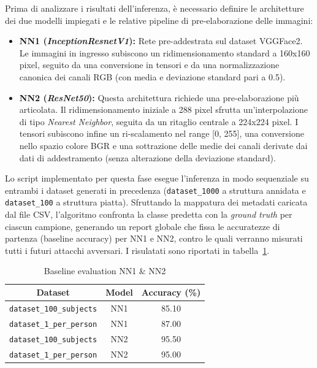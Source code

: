 \documentclass[a4paper, 12pt]{article}
\begin{document}
Prima di analizzare i risultati dell'inferenza, è necessario definire le architetture dei due modelli impiegati e le relative pipeline di pre-elaborazione delle immagini:

\begin{itemize}
    \item \textbf{NN1 (\textit{InceptionResnetV1}):} Rete pre-addestrata sul dataset VGGFace2. Le immagini in ingresso subiscono un ridimensionamento standard a 160x160 pixel, seguito da una conversione in tensori e da una normalizzazione canonica dei canali RGB (con media e deviazione standard pari a 0.5).
    
    \item \textbf{NN2 (\textit{ResNet50}):} Questa architettura richiede una pre-elaborazione più articolata. Il ridimensionamento iniziale a 288 pixel sfrutta un'interpolazione di tipo \textit{Nearest Neighbor}, seguita da un ritaglio centrale a 224x224 pixel. I tensori subiscono infine un ri-scalamento nel range [0, 255], una conversione nello spazio colore BGR e una sottrazione delle medie dei canali derivate dai dati di addestramento (senza alterazione della deviazione standard).
\end{itemize}

Lo script implementato per questa fase esegue l'inferenza in modo sequenziale su entrambi i dataset generati in precedenza (\texttt{dataset\_1000} a struttura annidata e \texttt{dataset\_100} a struttura piatta). Sfruttando la mappatura dei metadati caricata dal file CSV, l'algoritmo confronta la classe predetta con la \textit{ground truth} per ciascun campione, generando un report globale che fissa le accuratezze di partenza (baseline accuracy) per NN1 e NN2, contro le quali verranno misurati tutti i futuri attacchi avversari. I risulatati sono riportati in tabella~\ref{tab:NN1_NN2_baseline}. 

\begin{table}[h]
    \centering
    \begin{tabular}{ccc}
        \toprule
        \textbf{Dataset} & \textbf{Model} & \textbf{Accuracy (\%)} \\
        \midrule
        \texttt{dataset\_100\_subjects} & NN1 & 85.10 \\ 
        \texttt{dataset\_1\_per\_person} & NN1 & 87.00 \\
        \texttt{dataset\_100\_subjects} & NN2 & 95.50 \\ \texttt{dataset\_1\_per\_person} & NN2 & 95.00 \\
        \bottomrule
    \end{tabular}
    \caption{Baseline evaluation NN1 \& NN2}
    \label{tab:NN1_NN2_baseline}
\end{table}
\end{document}
